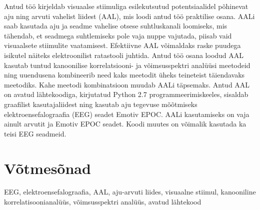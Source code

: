 Antud töö kirjeldab visuaalse stiimuliga esilekutsutud potentsiaalidel põhinevat aju ning arvuti vahelist liidest (AAL), mis loodi antud töö praktilise osana. AALi saab kasutada aju ja seadme vahelise otsese suhtluskanali loomiseks, mis tähendab, et seadmega suhtlemiseks pole vaja nuppe vajutada, piisab vaid visuaalsete stiimulite vaatamisest. Efektiivne AAL võimaldaks raske puudega isikutel näiteks elektroonilist ratastooli juhtida. Antud töö osana loodud AAL kasutab tuntud kanoonilise korrelatsiooni- ja võimsusspektri analüüsi meetodeid ning uuendusena kombineerib need kaks meetodit üheks teineteist täiendavaks meetodiks. Kahe meetodi kombinatsioon muudab AALi täpsemaks. Antud AAL on avatud lähtekoodiga, kirjutatud Python 2.7 programmeerimiskeeles, sisaldab graafilist kasutajaliidest ning kasutab aju tegevuse mõõtmiseks elektroensefalograafia (EEG) seadet Emotiv EPOC. AALi kasutamiseks on vaja ainult arvutit ja Emotiv EPOC seadet. Koodi muutes on võimalik kasutada ka teisi EEG seadmeid. 

\section*{Võtmesõnad}

EEG, elektroensefalograafia, AAL, aju-arvuti liides, visuaalne stiimul, kanooniline korrelatisoonianalüüs, võimsusspektri analüüs, avatud lähtekood
